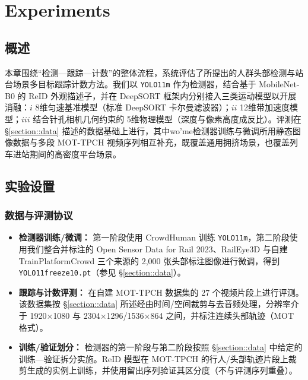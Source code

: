 \iffalse
\section{Experiments}\label{section::Experiments}
\subsection{概述}
本章围绕“检测—跟踪—计数”的整体流程，系统评估了所提出的人群头部检测与站台场景多目标跟踪计数方法。我们以 \texttt{YOLO11m} 作为检测器，结合基于 MobileNet-B0 的 ReID 外观描述子，并在 DeepSORT 框架内分别接入三类运动模型以开展消融：\(i\) 8维匀速基准模型（标准 DeepSORT 卡尔曼滤波器）；\(ii\) 12维带加速度模型；\(iii\) 结合针孔相机几何约束的 5维物理模型（深度与像素高度成反比）。评测在 \S\ref{section::data} 描述的数据基础上进行，其中wo'me检测器训练与微调所用静态图像数据与多段 MOT-TPCH 视频序列相互补充，既覆盖通用拥挤场景，也覆盖列车进站期间的高密度平台场景。

\subsection{实验设置}
\subsubsection{数据与评测协议}
\begin{itemize}
    \item \textbf{检测器训练/微调：} 第一阶段使用 CrowdHuman 训练 \texttt{YOLO11m}，第二阶段使用我们整合并标注的 Open Sensor Data for Rail 2023、RailEye3D 与自建 TrainPlatformCrowd 三个来源的 2,000 张头部标注图像进行微调，得到 \texttt{YOLO11freeze10.pt}（参见 \S\ref{section::data}）。
    \item \textbf{跟踪与计数评测：} 在自建 MOT-TPCH 数据集的 27 个视频片段上进行评测。该数据集按 \S\ref{section::data} 所述经由时间/空间裁剪与去音频处理，分辨率介于 1920\(\times\)1080 与 2304\(\times\)1296/1536\(\times\)864 之间，并标注连续头部轨迹（MOT 格式）。
    \item \textbf{训练/验证划分：} 检测器的第一阶段与第二阶段按照 \S\ref{section::data} 中给定的训练—验证拆分实施。ReID 模型在 MOT-TPCH 的行人/头部轨迹片段上裁剪生成的实例上训练，并使用留出序列验证其区分度（不与评测序列重叠）。
\end{itemize}

